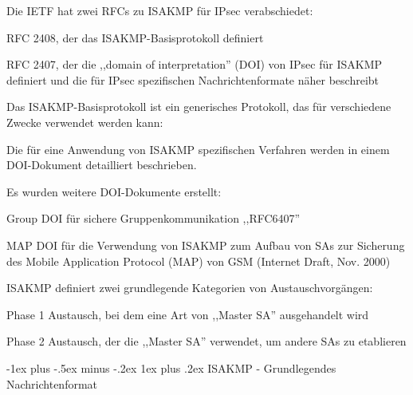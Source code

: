 \documentclass[a4paper]{article}
\makeatletter
\renewcommand{\subsubsection}{\@startsection{subsubsection}{3}{0mm}%
 {-1ex plus -.5ex minus -.2ex}%
 {1ex plus .2ex}%
 {\normalfont\small\bfseries}}
\makeatother
\begin{document}
\begin{multicols}{3}
      \begin{itemize*}
            \item Die IETF hat zwei RFCs zu ISAKMP für IPsec verabschiedet:
            \begin{itemize*}
                  \item RFC 2408, der das ISAKMP-Basisprotokoll definiert
                  \item RFC 2407, der die ,,domain of interpretation'' (DOI) von IPsec für ISAKMP definiert und die für IPsec spezifischen Nachrichtenformate näher beschreibt
            \end{itemize*}
            \item Das ISAKMP-Basisprotokoll ist ein generisches Protokoll, das für
            verschiedene Zwecke verwendet werden kann:
            \begin{itemize*}
                  \item Die für eine Anwendung von ISAKMP spezifischen Verfahren werden in einem DOI-Dokument detailliert beschrieben.
                  \item Es wurden weitere DOI-Dokumente erstellt:
                  \begin{itemize*} \item Group DOI für sichere Gruppenkommunikation ,,RFC6407'' \item MAP DOI für die Verwendung von ISAKMP zum Aufbau von SAs zur Sicherung des Mobile Application Protocol (MAP) von GSM (Internet Draft, Nov. 2000) \end{itemize*}
            \end{itemize*}
            \item ISAKMP definiert zwei grundlegende Kategorien von Austauschvorgängen:
            \begin{itemize*}
                  \item Phase 1 Austausch, bei dem eine Art von ,,Master SA'' ausgehandelt wird
                  \item Phase 2 Austausch, der die ,,Master SA'' verwendet, um andere SAs zu etablieren
            \end{itemize*}
      \end{itemize*}


      \subsubsection{ISAKMP - Grundlegendes
            Nachrichtenformat}


\end{multicols}
\end{document}
